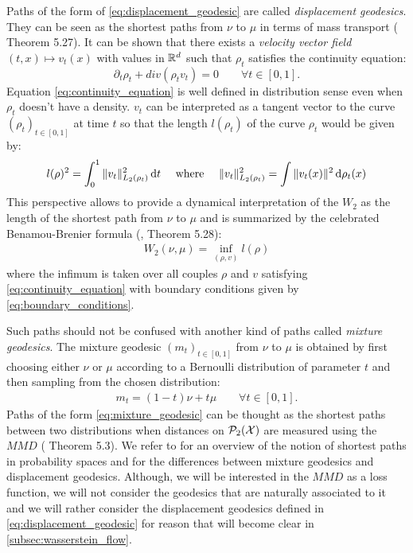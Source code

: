 Paths of the form of \cref{eq:displacement_geodesic} are called \textit{displacement geodesics}. They can be seen as the shortest paths from $\nu$ to $\mu$ in terms of mass transport (\cite{Santambrogio:2015} Theorem 5.27). It can be shown that there exists a \textit{velocity vector field} $(t,x)\mapsto v_t(x)$ with values in ${{\mathbb R}}^d$ such that $\rho_t$ satisfies the continuity equation:
\begin{equation}\label{eq:continuity_equation}
\partial_t \rho_t + div(\rho_t v_t ) = 0 \qquad \forall t\in[0,1].
\end{equation}
Equation \cref{eq:continuity_equation} is well defined in distribution sense even when $\rho_t$ doesn't have a density. $v_t$ can be interpreted as a tangent vector to the curve $(\rho_t)_{t\in[0,1]}$ at time $t$ so that the length $l(\rho_t)$ of the curve $\rho_t$ would be given by:
\begin{equation}
l(\rho)^2 = \int_0^1 \Vert v_t \Vert^2_{L_2(\rho_t)} \mathop{}\!\mathrm{d} t \quad \text{ where } \quad 
\Vert v_t \Vert^2_{L_2(\rho_t)} =  \int \Vert v_t(x) \Vert^2 \mathop{}\!\mathrm{d} \rho_t(x)
\end{equation}
This perspective allows to provide a dynamical interpretation of the $W_2$ as the length  of the shortest path from $\nu$ to $\mu$ and is summarized by the celebrated Benamou-Brenier formula (\cite{Santambrogio:2015}, Theorem 5.28):
\begin{align}\label{eq:benamou-brenier-formula}
W_2(\nu,\mu) = \inf_{(\rho,v)} l(\rho)
\end{align}
where the infimum is taken  over all couples  $\rho$ and $v$ satisfying  \cref{eq:continuity_equation}  with boundary conditions given by \cref{eq:boundary_conditions}.

\begin{remark}
	Such paths should not be confused with another kind of paths called \textit{mixture geodesics}. The mixture geodesic $(m_t)_{t\in[0,1]}$ from $\nu$ to $\mu$ is obtained by first choosing either $\nu$ or $\mu$ according to a Bernoulli distribution of parameter $t$ and then sampling from the chosen distribution:
	\begin{align}\label{eq:mixture_geodesic}
	m_t = (1-t)\nu + t\mu \qquad \forall t \in [0,1].
	\end{align}
	Paths of the form \cref{eq:mixture_geodesic} can be thought as the shortest paths between two distributions when distances on $\mathcal{P}_2({{\mathcal X}})$ are measured using the $MMD$ (\cite{Bottou:2017} Theorem 5.3). We refer to \cite{Bottou:2017} for an overview of the notion of shortest paths in probability spaces and for the differences between mixture geodesics and displacement geodesics.
	Although, we will be interested in the $MMD$ as a loss function, we will not consider the geodesics that are naturally associated to it and we will rather consider the displacement geodesics defined in \cref{eq:displacement_geodesic} for reason that will become clear in \cref{subsec:wasserstein_flow}.
\end{remark}


